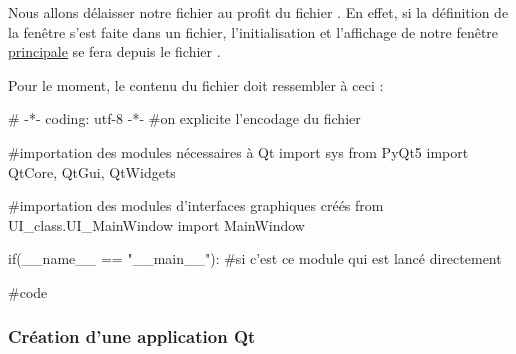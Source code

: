 Nous allons délaisser notre fichier  au profit du fichier . En effet, si la définition de la fenêtre s'est faite dans un fichier, l'initialisation et l'affichage de notre fenêtre \underline{principale} se fera depuis le fichier .\smallSkip

Pour le moment, le contenu du fichier  doit ressembler à ceci :
\begin{pyCode}
# -*- coding: utf-8 -*-
#on  explicite l’encodage  du  fichier

#importation des modules nécessaires à Qt
import sys
from PyQt5 import QtCore, QtGui, QtWidgets

#importation des modules d'interfaces graphiques créés
from UI_class.UI_MainWindow import MainWindow


if(__name__ == "__main__"): #si c'est ce module qui est lancé directement

	#code
\end{pyCode}

\subsubsection{Création d'une application Qt}

